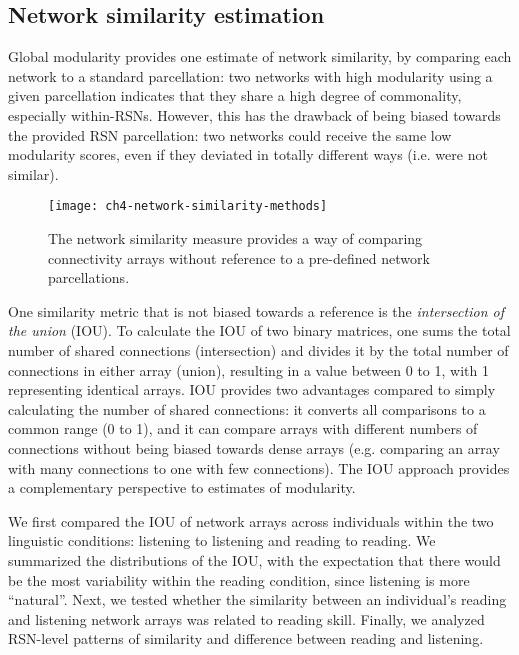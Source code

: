 \subsection{Network similarity estimation}

Global modularity provides one estimate of network similarity, by comparing each network to a standard parcellation: two networks with high modularity using a given parcellation indicates that they share a high degree of commonality, especially within-RSNs. However, this has the drawback of being biased towards the provided RSN parcellation: two networks could receive the same low modularity scores, even if they deviated in totally different ways (i.e. were not similar). 

\begin{figure}[t]
	\centering
	\texttt{[image: ch4-network-similarity-methods]}
    \caption[Methods for measuring similarity between whole-brain connectomes.]{The network similarity measure provides a way of comparing connectivity arrays without reference to a pre-defined network parcellations.}
	\label{fig:ch4-network-similarity-methods}
\end{figure}

One similarity metric that is not biased towards a reference is the \textit{intersection of the union} (IOU). To calculate the IOU of two binary matrices, one sums the total number of shared connections (intersection) and divides it by the total number of connections in either array (union), resulting in a value between 0 to 1, with 1 representing identical arrays. IOU provides two advantages compared to simply calculating the number of shared connections: it converts all comparisons to a common range (0 to 1), and it can compare arrays with different numbers of connections without being biased towards dense arrays (e.g. comparing an array with many connections to one with few connections). The IOU approach provides a complementary perspective to estimates of modularity.

We first compared the IOU of network arrays across individuals within the two linguistic conditions: listening to listening and reading to reading. We summarized the distributions of the IOU, with the expectation that there would be the most variability within the reading condition, since listening is more ``natural''. Next, we tested whether the similarity between an individual's reading and listening network arrays was related to reading skill. Finally, we analyzed RSN-level patterns of similarity and difference between reading and listening. 

